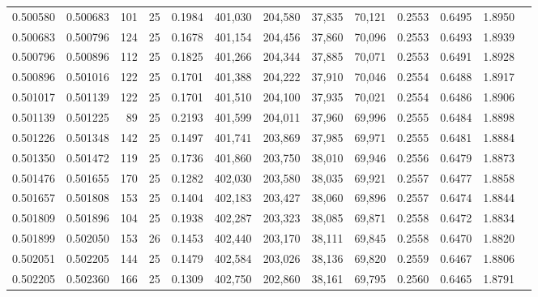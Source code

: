 \begin{tabular}{rrrrrrrrrrrrr}
0.500580 & 0.500683 &   101 &  25 &                                     0.1984 & 401,030 & 204,580 &  37,835 &  70,121 & 0.2553 & 0.6495 & 1.8950 \\
0.500683 & 0.500796 &   124 &  25 &                                     0.1678 & 401,154 & 204,456 &  37,860 &  70,096 & 0.2553 & 0.6493 & 1.8939 \\
0.500796 & 0.500896 &   112 &  25 &                                     0.1825 & 401,266 & 204,344 &  37,885 &  70,071 & 0.2553 & 0.6491 & 1.8928 \\
0.500896 & 0.501016 &   122 &  25 &                                     0.1701 & 401,388 & 204,222 &  37,910 &  70,046 & 0.2554 & 0.6488 & 1.8917 \\
0.501017 & 0.501139 &   122 &  25 &                                     0.1701 & 401,510 & 204,100 &  37,935 &  70,021 & 0.2554 & 0.6486 & 1.8906 \\
0.501139 & 0.501225 &    89 &  25 &                                     0.2193 & 401,599 & 204,011 &  37,960 &  69,996 & 0.2555 & 0.6484 & 1.8898 \\
0.501226 & 0.501348 &   142 &  25 &                                     0.1497 & 401,741 & 203,869 &  37,985 &  69,971 & 0.2555 & 0.6481 & 1.8884 \\
0.501350 & 0.501472 &   119 &  25 &                                     0.1736 & 401,860 & 203,750 &  38,010 &  69,946 & 0.2556 & 0.6479 & 1.8873 \\
0.501476 & 0.501655 &   170 &  25 &                                     0.1282 & 402,030 & 203,580 &  38,035 &  69,921 & 0.2557 & 0.6477 & 1.8858 \\
0.501657 & 0.501808 &   153 &  25 &                                     0.1404 & 402,183 & 203,427 &  38,060 &  69,896 & 0.2557 & 0.6474 & 1.8844 \\
0.501809 & 0.501896 &   104 &  25 &                                     0.1938 & 402,287 & 203,323 &  38,085 &  69,871 & 0.2558 & 0.6472 & 1.8834 \\
0.501899 & 0.502050 &   153 &  26 &                                     0.1453 & 402,440 & 203,170 &  38,111 &  69,845 & 0.2558 & 0.6470 & 1.8820 \\
0.502051 & 0.502205 &   144 &  25 &                                     0.1479 & 402,584 & 203,026 &  38,136 &  69,820 & 0.2559 & 0.6467 & 1.8806 \\
0.502205 & 0.502360 &   166 &  25 &                                     0.1309 & 402,750 & 202,860 &  38,161 &  69,795 & 0.2560 & 0.6465 & 1.8791 \\

\end{tabular}

